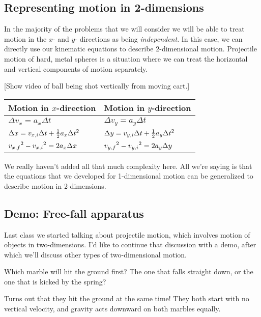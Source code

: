 \vspace{6cm}

\subsection{Representing motion in 2-dimensions}
In the majority of the problems that we will consider we will be able to treat motion in the $x$- and $y$- directions as being \textit{independent}. In this case, we can directly use our kinematic equations to describe 2-dimensional motion. Projectile motion of hard, metal spheres is a situation where we can treat the horizontal and vertical components of motion separately.

[Show video of ball being shot vertically from moving cart.]

\begin{table}[h]
\begin{tabular}{ll}
\textbf{Motion in $x$-direction}\hspace{3cm} & \textbf{Motion in $y$-direction}\\
\hline
$\Delta{v_x}=a_x\Delta{t}$ & $\Delta{v_y}=a_y\Delta{t}$\\
$\Delta{x}=v_{x,i}\Delta{t}+\frac{1}{2}a_x\Delta{t}\displaystyle^2$ & $\Delta{y}=v_{y,i}\Delta{t}+\frac{1}{2}a_y\Delta{t}\displaystyle^2$\\
$v_{x,f}\displaystyle^2-v_{x,i}\displaystyle^2=2a_x\Delta{x}$ & $v_{y,f}\displaystyle^2-v_{y,i}\displaystyle^2=2a_y\Delta{y}$\\
\hline
\end{tabular}
\end{table}

We really haven't added all that much complexity here. All we're saying is that the equations that we developed for 1-dimensional motion can be generalized to describe motion in 2-dimensions.


\subsection{Demo: Free-fall apparatus}
Last class we started talking about projectile motion, which involves motion of objects in two-dimensions. I'd like to continue that discussion with a demo, after which we'll discuss other types of two-dimensional motion.

Which marble will hit the ground first? The one that falls straight down, or the one that is kicked by the spring?

Turns out that they hit the ground at the same time! They both start with no vertical velocity, and gravity acts downward on both marbles equally.

